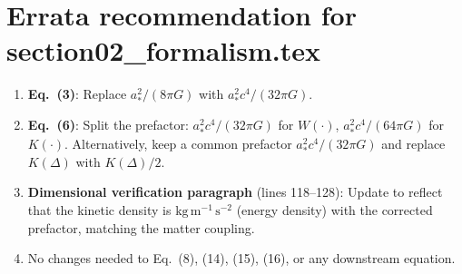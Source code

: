 \documentclass[aps,prd,twocolumn,nofootinbib]{revtex4-2}
\begin{document}
\section*{Errata recommendation for section02\_formalism.tex}

\begin{enumerate}
\item \textbf{Eq.~(3)}: Replace $a_*^2/(8\pi G)$ with $a_*^2 c^4/(32\pi G)$.
\item \textbf{Eq.~(6)}: Split the prefactor: $a_*^2 c^4/(32\pi G)$ for
  $W(\cdot)$, $a_*^2 c^4/(64\pi G)$ for $K(\cdot)$.
  Alternatively, keep a common prefactor $a_*^2 c^4/(32\pi G)$ and
  replace $K(\Delta)$ with $K(\Delta)/2$.
\item \textbf{Dimensional verification paragraph} (lines 118--128):
  Update to reflect that the kinetic density is
  $\text{kg}\,\text{m}^{-1}\,\text{s}^{-2}$ (energy density) with the
  corrected prefactor, matching the matter coupling.
\item No changes needed to Eq.~(8), (14), (15), (16), or any
  downstream equation.
\end{enumerate}
\end{document}
